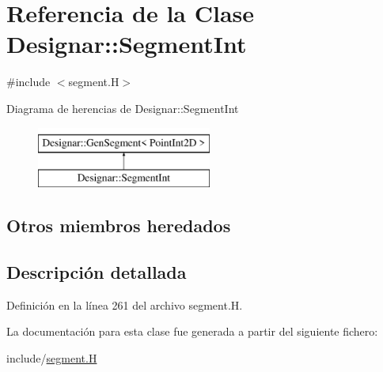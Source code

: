 \hypertarget{class_designar_1_1_segment_int}{}\section{Referencia de la Clase Designar\+:\+:Segment\+Int}
\label{class_designar_1_1_segment_int}


{\ttfamily \#include $<$segment.\+H$>$}

Diagrama de herencias de Designar\+:\+:Segment\+Int\begin{figure}[H]
\begin{center}
\leavevmode
\includegraphics[height=2.000000cm]{class_designar_1_1_segment_int}
\end{center}
\end{figure}
\subsection*{Otros miembros heredados}


\subsection{Descripción detallada}


Definición en la línea 261 del archivo segment.\+H.



La documentación para esta clase fue generada a partir del siguiente fichero\+:\begin{DoxyCompactItemize}
\item 
include/\hyperlink{segment_8_h}{segment.\+H}\end{DoxyCompactItemize}
